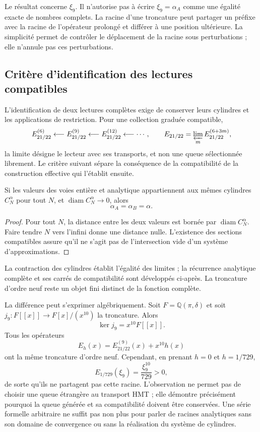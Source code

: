 Le résultat concerne \(\xi_9\). Il n'autorise pas à écrire \(\xi_9=\alpha_A\) comme une égalité exacte de nombres complets. La racine d'une troncature peut partager un préfixe avec la racine de l'opérateur prolongé et différer à une position ultérieure. La simplicité permet de contrôler le déplacement de la racine sous perturbations ; elle n'annule pas ces perturbations.

\subsection{Critère d'identification des lectures compatibles}
\label{subsec:alpha-limite-dos-vias}

L'identification de deux lectures complètes exige de conserver leurs cylindres
et les applications de restriction. Pour une collection graduée compatible,
\[
 E_{21/22}^{(6)}\longleftarrow E_{21/22}^{(9)}
 \longleftarrow E_{21/22}^{(12)}\longleftarrow\cdots,
 \qquad
 E_{21/22}=\varprojlim_m E_{21/22}^{(6+3m)},
\]
la limite désigne le lecteur avec ses transports, et non une queue sélectionnée
librement. Le critère suivant sépare la conséquence de la
compatibilité de la construction effective qui l'établit ensuite.

\begin{proposition}
\label{prop:alpha-dos-limites}
Si les valeurs des voies entière et analytique appartiennent aux mêmes cylindres \(C_N^\alpha\) pour tout \(N\), et
\(\operatorname{diam}C_N^\alpha\to0\), alors
\[
 \alpha_A=\alpha_B=\alpha.
\]
\end{proposition}

\begin{proof}
Pour tout \(N\), la distance entre les deux valeurs est bornée
par \(\operatorname{diam}C_N^\alpha\). Faire tendre \(N\) vers l'infini
donne une distance nulle. L'existence des sections compatibles assure
qu'il ne s'agit pas de l'intersection vide d'un système d'approximations.
\end{proof}

La contraction des cylindres établit l’égalité des limites ;
la récurrence analytique complète et ses carrés de compatibilité
sont développés ci-après. La troncature d’ordre neuf reste
un objet fini distinct de la fonction complète.

La différence peut s'exprimer algébriquement. Soit \(F=\mathbb Q(\pi,\delta)\) et soit \(j_9:F[[x]]\to F[x]/(x^{10})\) la troncature. Alors
\[
 \ker j_9=x^{10}F[[x]].
\]
Tous les opérateurs
\[
 E_h(x)=E_{21/22}^{(9)}(x)+x^{10}h(x)
\]
ont la même troncature d'ordre neuf. Cependant, en prenant
\(h=0\) et \(h=1/729\),
\[
 E_{1/729}(\xi_9)=\frac{\xi_9^{10}}{729}>0,
\]
de sorte qu'ils ne partagent pas cette racine. L'observation ne permet pas de choisir une queue étrangère au transport HMT ; elle démontre précisément pourquoi la queue générée et sa compatibilité doivent être conservées. Une série formelle arbitraire ne suffit pas non plus pour parler de racines analytiques sans son domaine de convergence ou sans la réalisation du système de cylindres.


